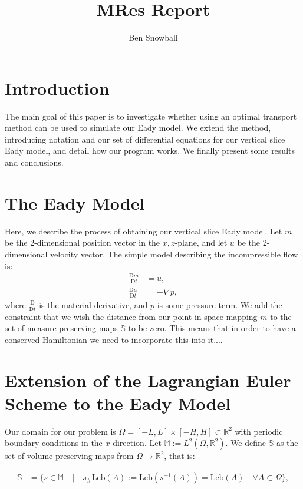 \documentclass[11pt, oneside]{article}   	%
\title{MRes Report}
\author{Ben Snowball}
\newcommand{\R}{\mathbb{R}}
\newcommand{\M}{\mathbb{M}}
\newcommand{\Leb}{\mathrm{Leb}}
\newcommand{\DmDt}{\frac{\mathrm{D}m}{\mathrm{D}t}}
\newcommand{\DuDt}{\frac{\mathrm{D}u}{\mathrm{D}t}}
\begin{document}
\maketitle
\section{Introduction}

The main goal of this paper is to investigate whether using an optimal transport method can be used to simulate our Eady model. We extend the method, introducing notation and our set of differential equations for our vertical slice Eady model, and detail how our program works. We finally present some results and conclusions.


\section{The Eady Model}

Here, we describe the process of obtaining our vertical slice Eady model. Let \(m\) be the 2-dimensional position vector in the \(x,z\text{-plane}\), and let \(u\) be the 2-dimensional velocity vector. The simple model describing the incompressible flow is:
\begin{align}
\DmDt &= u, \\
\DuDt &= -\nabla p, 
\end{align}
where \(\frac{\mathrm{D}}{\mathrm{D}t}\) is the material derivative, and \(p\) is some pressure term. We add the constraint that we wish the distance from our point in space mapping \(m\) to the set of measure preserving maps \(\mathbb{S}\) to be zero. This means that in order to have a conserved Hamiltonian we need to incorporate this into it....



\section{Extension of the Lagrangian Euler Scheme to the Eady Model}

Our domain for our problem is \(\Omega = [-L, L] \times [-H, H] \subset \R^2\) with periodic boundary conditions in the \(x\)-direction. Let \(\M := L^2(\Omega, \R^2)\). We define \(\mathbb{S}\) as the set of volume preserving maps from \(\Omega \to \R^2\), that is:

\begin{align}
\mathbb{S} &= \{ s \in \M \quad | \quad s_{\#}\Leb(A) := \Leb(s^{-1}(A)) = \Leb(A) \quad \forall A \subset \Omega \},
\end{align}
\end{document}
